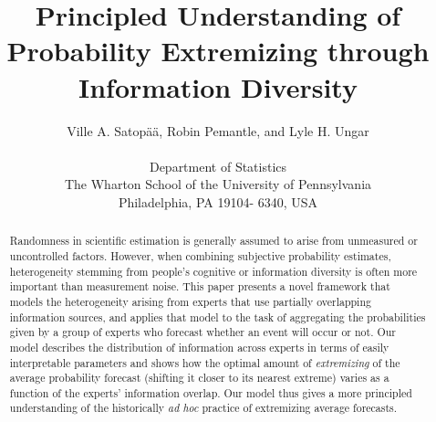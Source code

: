 \documentclass[11pt,twoside]{article}
\theoremstyle{definition}
\theoremstyle{definition}
\begin{document}
\title{Principled Understanding of Probability Extremizing through Information Diversity}
\author{
Ville A. Satop\"a\"a, Robin Pemantle, and Lyle H. Ungar\\
\\
 \small Department of Statistics\\
 \small The Wharton School of the University of Pennsylvania\\
 \small Philadelphia, PA 19104- 6340, USA\\ [-0.25in]} \date{}
\maketitle

\pagestyle{myheadings}
\thispagestyle{empty}

\begin{abstract}
Randomness in scientific estimation is generally assumed to arise from
unmeasured or uncontrolled factors. However, when combining subjective probability estimates, heterogeneity
stemming from people's cognitive or information diversity is often
more important than measurement noise.  This paper presents a novel
framework that models the heterogeneity arising
from experts that use partially overlapping information sources, and applies that model to the task of
aggregating the probabilities given by a group of experts who forecast
whether an event will occur or not. Our model describes the
distribution of information across experts in terms of easily
interpretable parameters and shows how the optimal amount
of \textit{extremizing} of the average probability forecast (shifting
it closer to its nearest extreme) varies as a function of the experts'
information overlap.  Our model thus gives a more principled
understanding of the historically {\it ad hoc} practice of extremizing
average forecasts.
\end{abstract}
\end{document}
